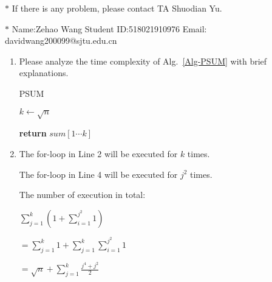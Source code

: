 \documentclass[12pt,a4paper]{article}
\makeatletter
\newtheorem*{solution}{Solution}
\theoremstyle{definition}
\renewenvironment{solution}[1][Solution] {\par\pushQED{\qed}\normalfont\topsep6\p@\@plus6\p@\relax\trivlist\item[\hskip\labelsep\bfseries#1\@addpunct{.}]\ignorespaces}{\popQED\endtrivlist\@endpefalse} \makeatother
\makeatother
\begin{document}
\noindent

\noindent{}
\begin{center}
\footnotesize{\color{red}$*$ If there is any problem, please contact TA Shuodian Yu.}

\footnotesize{\color{blue}$*$ Name:Zehao Wang  \quad Student ID:518021910976 \quad Email: davidwang200099@sjtu.edu.cn}
\end{center}

\begin{enumerate}
    \item
    Please analyze the time complexity of Alg.~\ref{Alg-PSUM} with brief explanations.

    \begin{minipage}[t]{0.8\textwidth}
    \begin{algorithm}[H]
        \caption{PSUM}\label{Alg-PSUM}

        \BlankLine

        $k \leftarrow \sqrt{n}$\;


        {\bf return} $sum[1\cdots k]$\;
    \end{algorithm}
    \end{minipage}

    \begin{solution}
        The for-loop in Line 2 will be executed for $k$ times.
        
        The for-loop in Line 4 will be executed for $j^2$ times.

        The number of execution in total:

            \quad$\sum_{j=1}^k(1+\sum_{i=1}^{j^2}1)$
            
           \quad $=\sum_{j=1}^k 1+\sum_{j=1}^k\sum_{i=1}^{j^2} 1$
            
           \quad $=\sqrt{n}+\sum_{j=1}^k\frac{j^4+j^2}{2}$
            

\end{solution}
\end{enumerate}
\end{document}
